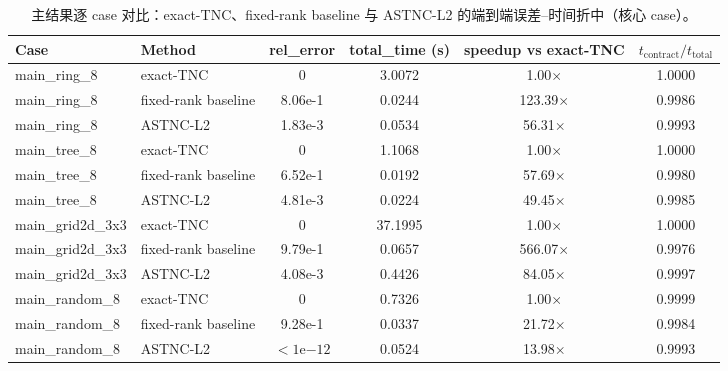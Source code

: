 ﻿\begin{table}[t]
\centering
\small
\caption{主结果逐 case 对比：exact-TNC、fixed-rank baseline 与 \textsf{ASTNC-L2} 的端到端误差--时间折中（核心 case）。}
\label{tab:main-results-casewise}
\begin{tabular}{llcccc}
\toprule
Case & Method & rel\_error & total\_time (s) & speedup vs exact-TNC & $t_{\mathrm{contract}}/t_{\mathrm{total}}$ \\
\midrule
main\_ring\_8 & exact-TNC & 0 & 3.0072 & 1.00$\times$ & 1.0000 \\
main\_ring\_8 & fixed-rank baseline & 8.06e-1 & 0.0244 & 123.39$\times$ & 0.9986 \\
main\_ring\_8 & ASTNC-L2 & 1.83e-3 & 0.0534 & 56.31$\times$ & 0.9993 \\
\midrule
main\_tree\_8 & exact-TNC & 0 & 1.1068 & 1.00$\times$ & 1.0000 \\
main\_tree\_8 & fixed-rank baseline & 6.52e-1 & 0.0192 & 57.69$\times$ & 0.9980 \\
main\_tree\_8 & ASTNC-L2 & 4.81e-3 & 0.0224 & 49.45$\times$ & 0.9985 \\
\midrule
main\_grid2d\_3x3 & exact-TNC & 0 & 37.1995 & 1.00$\times$ & 1.0000 \\
main\_grid2d\_3x3 & fixed-rank baseline & 9.79e-1 & 0.0657 & 566.07$\times$ & 0.9976 \\
main\_grid2d\_3x3 & ASTNC-L2 & 4.08e-3 & 0.4426 & 84.05$\times$ & 0.9997 \\
\midrule
main\_random\_8 & exact-TNC & 0 & 0.7326 & 1.00$\times$ & 0.9999 \\
main\_random\_8 & fixed-rank baseline & 9.28e-1 & 0.0337 & 21.72$\times$ & 0.9984 \\
main\_random\_8 & ASTNC-L2 & $<1\mathrm{e}{-12}$ & 0.0524 & 13.98$\times$ & 0.9993 \\
\bottomrule
\end{tabular}
\end{table}

\begin{table}[t]
\centering
\small
\caption{主结果跨 case 汇总（核心 case：ring/tree/grid2d/random）。}
\label{tab:main-results-summary}
\end{table}
